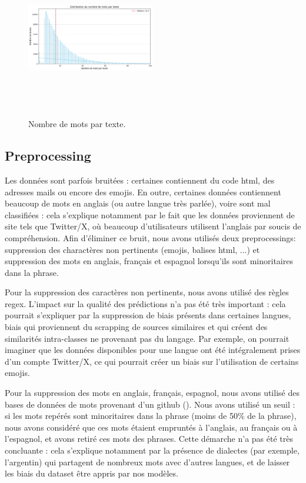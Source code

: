 \begin{figure}[h!]
    \centering
    \includegraphics[width=0.5\textwidth, height=7cm]{img/word_count.png}
    \caption{Nombre de mots par texte.}
    \label{fig:unbalance}
\end{figure}


\subsection{Preprocessing}
Les données sont parfois bruitées : certaines contiennent du code html, des adresses mails ou encore des emojis. En outre, certaines données contiennent beaucoup de mots en anglais (ou autre langue très parlée), voire sont mal classifiées : cela s'explique notamment par le fait que les données proviennent de site tels que Twitter/X, où beaucoup d'utilisateurs utilisent l'anglais par soucis de compréhension. Afin d'éliminer ce bruit, nous avons utilisés deux preprocessings: suppression des charactères non pertinents (emojis, balises html, ...) et suppression des mots en anglais, français et espagnol lorsqu'ils sont minoritaires dans la phrase.

Pour la suppression des caractères non pertinents, nous avons utilisé des règles regex. L'impact sur la qualité des prédictions n'a pas été très important : cela pourrait s'expliquer par la suppression de biais présents dans certaines langues, biais qui proviennent du scrapping de sources similaires et qui créent des similarités intra-classes ne provenant pas du langage. Par exemple, on pourrait imaginer que les données disponibles pour une langue ont été intégralement prises d'un compte Twitter/X, ce qui pourrait créer un biais sur l'utilisation de certains emojis.

Pour la suppression des mots en anglais, français, espagnol, nous avons utilisé des bases de données de mots provenant d'un github (\cite{hermitdave2018frequency}). Nous avons utilisé un seuil : si les mots repérés sont minoritaires dans la phrase (moins de 50\% de la phrase), nous avons considéré que ces mots étaient empruntés à l'anglais, au français ou à l'espagnol, et avons retiré ces mots des phrases. Cette démarche n'a pas été très concluante : cela s'explique notamment par la présence de dialectes (par exemple, l'argentin) qui partagent de nombreux mots avec d'autres langues, et de laisser les biais du dataset être appris par nos modèles.

